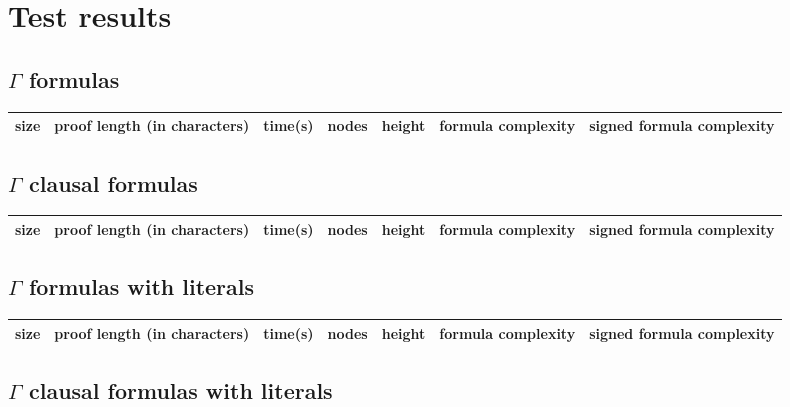 \documentclass[a4]{article}
\begin{document}
\newenvironment{ctabular}
		{\begin{center}\begin{tabular}}
		{\end{tabular}\end{center}}

\section{Test results}
\label{tests}



\subsection{$\Gamma$ formulas}

\begin{ctabular}{|l|p{2cm}|c|c|c|c|c|} \hline
size & proof length (in characters) & time(s) & nodes & height & formula complexity & signed formula complexity  \\ \hline

\end{ctabular}


\subsection{$\Gamma$ clausal formulas}

\begin{ctabular}{|l|p{2cm}|c|c|c|c|c|} \hline
size & proof length (in characters) & time(s) & nodes & height & formula complexity & signed formula complexity  \\ \hline

\end{ctabular}

\subsection{$\Gamma$ formulas with literals}

\begin{ctabular}{|l|p{2cm}|c|c|c|c|c|} \hline
size & proof length (in characters) & time(s) & nodes & height & formula complexity & signed formula complexity  \\ \hline

\end{ctabular}

\subsection{$\Gamma$ clausal formulas with literals}
\end{document}
